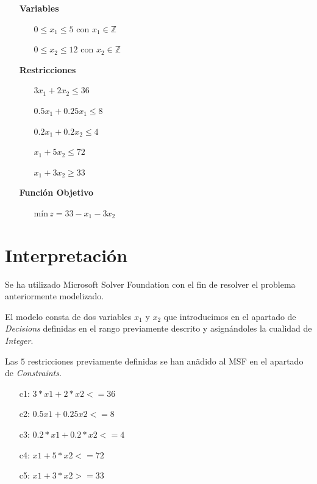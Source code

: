 \documentclass[a4paper,12pt]{article}
\begin{document}
\begin{itemize}

\item[\textbf{Variables}]
	\begin{itemize}
		\item[] $0 \leq x_1 \leq 5 \text{ con } x_1\in \mathds{Z}$
		\item[] $0 \leq x_2 \leq 12 \text{ con } x_2\in \mathds{Z}$
	\end{itemize}
	
\item[\textbf{Restricciones}]

\begin{itemize}

		\item[] $3x_1 + 2x_2 \leq 36$
		\item[] $0.5x_1 + 0.25x_1 \leq 8$
		\item[] $0.2x_1 + 0.2x_2 \leq 4$
		\item[] $x_1 + 5x_2 \leq 72$
		\item[] $x_1 + 3x_2 \geq 33$


\end{itemize}
	
	
\item[\textbf{Funci\'on Objetivo}]
	\begin{itemize}
			\item[] $\text{m\'in}\,z = 33 - x_1 - 3x_2$
	\end{itemize}
\end{itemize}

\pagebreak

\section{Interpretaci\'on}
Se ha utilizado Microsoft Solver Foundation con el fin de resolver el problema anteriormente modelizado. 

El modelo consta de dos variables $x_1$ y $x_2$ que introducimos en el apartado de \textit{Decisions} definidas en el rango previamente descrito y asign\'andoles la cualidad de \textit{Integer}.

Las $5$ restricciones previamente definidas se han an\~adido al MSF en el apartado de \textit{Constraints}.

\begin{itemize}
\item[c1:] $3*x1 + 2*x2 <= 36$
\item[c2:] $0.5x1 + 0.25x2 <= 8$
\item[c3:] $0.2*x1 + 0.2*x2 <= 4$
\item[c4:] $x1 + 5*x2 <= 72$
\item[c5:] $x1 + 3*x2 >= 33$
\end{itemize}
\end{document}
